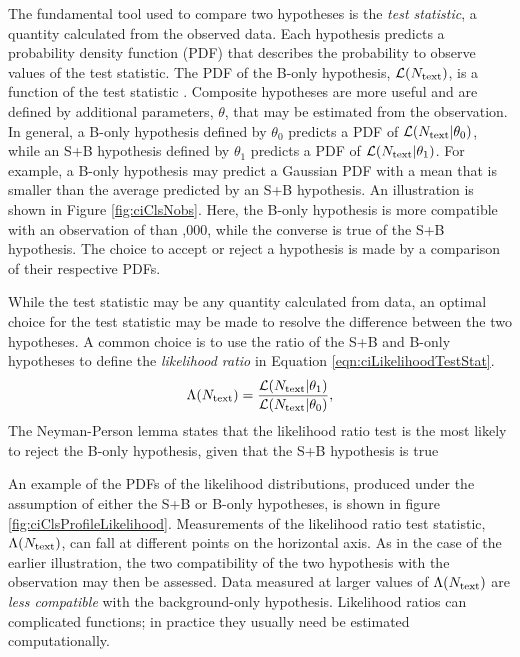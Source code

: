 
The fundamental tool used to compare two hypotheses is the \emph{test statistic}, a quantity calculated from the observed data.
Each hypothesis predicts a probability density function (PDF) that describes the probability to observe values of the test statistic.
The PDF of the B-only hypothesis, $\mathcal{L}(N_\mathrm{text})$, is a function of the test statistic \nobs.
Composite hypotheses are more useful and are defined by additional parameters, $\theta$, that may be estimated from the observation.
In general, a B-only hypothesis defined by $\theta_0$ predicts a PDF of $\mathcal{L}(N_\mathrm{text}|\theta_0)$, while an S+B hypothesis defined by $\theta_1$ predicts a PDF of $\mathcal{L}(N_\mathrm{text}|\theta_1)$.
For example, a B-only hypothesis may predict a Gaussian PDF with a mean that is smaller than the average predicted by an S+B hypothesis.
An illustration is shown in Figure \ref{fig:ciClsNobs}.
Here, the B-only hypothesis is more compatible with an observation of  than ,000, while the converse is true of the S+B hypothesis.
The choice to accept or reject a hypothesis is made by a comparison of their respective PDFs.

While the test statistic may be any quantity calculated from data, an optimal choice for the test statistic may be made to resolve the difference between the two hypotheses.
A common choice is to use the ratio of the S+B and B-only hypotheses to define the \emph{likelihood ratio} in Equation \ref{eqn:ciLikelihoodTestStat}.
\begin{equation}\begin{split}\label{eqn:ciLikelihoodTestStat}
    \Lambda(N_\mathrm{text})=\frac{\mathcal{L}(N_\mathrm{text}|\theta_1)}{\mathcal{L}(N_\mathrm{text}|\theta_0)},
\end{split}\end{equation} 
The Neyman-Person lemma states that the likelihood ratio test is the most likely to reject the B-only hypothesis, given that the S+B hypothesis is true \cite{eilam}

An example of the PDFs of the likelihood distributions, produced under the assumption of either the S+B or B-only hypotheses, is shown in figure \ref{fig:ciClsProfileLikelihood}.
Measurements of the likelihood ratio test statistic, $\Lambda(N_\mathrm{text})$, can fall at different points on the horizontal axis.
As in the case of the earlier illustration, the two compatibility of the two hypothesis with the observation may then be assessed.
Data measured at larger values of $\Lambda(N_\mathrm{text})$ are \emph{less compatible} with the background-only hypothesis.
Likelihood ratios can complicated functions; in practice they usually need be estimated computationally. 

